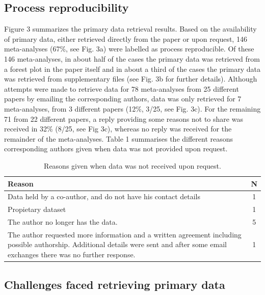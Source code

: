 \documentclass[
  ,man,floatsintext]{apa6}
\begin{document}
\hypertarget{process-reproducibility}{%
\subsection{Process reproducibility}\label{process-reproducibility}}

Figure 3 summarizes the primary data retrieval results. Based on the availability of primary data, either retrieved directly from the paper or upon request, 146 meta-analyses (67\%, see Fig. 3a) were labelled as process reproducible. Of these 146 meta-analyses, in about half of the cases the primary data was retrieved from a forest plot in the paper itself and in about a third of the cases the primary data was retrieved from supplementary files (see Fig. 3b for further details).
Although attempts were made to retrieve data for 78 meta-analyses from 25 different papers by emailing the corresponding authors, data was only retrieved for 7 meta-analyses, from 3 different papers (12\%, 3/25, see Fig. 3c). For the remaining 71 from 22 different papers, a reply providing some reasons not to share was received in 32\% (8/25, see Fig 3c), whereas no reply was received for the remainder of the meta-analyses. Table 1 summarises the different reasons corresponding authors given when data was not provided upon request.

\begin{table}

\caption{\label{tab:unnamed-chunk-2}Reasons given when data was not received upon request.}
\centering
\begin{tabular}[t]{>{\raggedright\arraybackslash}p{16cm}c}
\toprule
Reason & N\\
\midrule
Data held by a co-author, and do not have his contact details & 1\\
Propietary dataset & 1\\
The author no longer has the data. & 5\\
The author requested more information and a written agreement including possible authorship. 
                                                      Additional details were sent and after some email exchanges there was no further response. & 1\\
\bottomrule
\end{tabular}
\end{table}

\hypertarget{challenges-faced-retrieving-primary-data}{%
\subsection{Challenges faced retrieving primary data}\label{challenges-faced-retrieving-primary-data}}
\end{document}
